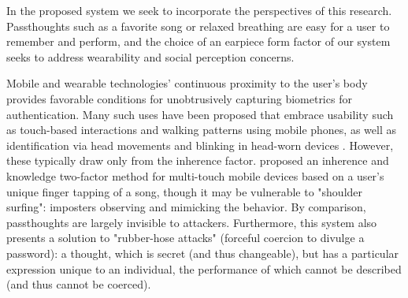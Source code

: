 \documentclass{sigchi}
\begin{document}
In the proposed system we seek to incorporate the perspectives of this research. Passthoughts such as a favorite song or relaxed breathing are easy for a user to remember and perform, and the choice of an earpiece form factor of our system seeks to address wearability and social perception concerns.

Mobile and wearable technologies' continuous proximity to the user's body provides favorable conditions for unobtrusively capturing biometrics for authentication. Many such uses have been proposed that embrace usability such as touch-based interactions \cite{Tartz2015, Holz2015} and walking patterns \cite{Lu2014} using mobile phones, as well as identification via head movements and blinking in head-worn devices \cite{Rogers2015}. However, these typically draw only from the inherence factor. \cite{Chen2015} proposed an inherence and knowledge two-factor method for multi-touch mobile devices based on a user's unique finger tapping of a song, though it may be vulnerable to "shoulder surfing": imposters observing and mimicking the behavior. By comparison, passthoughts are largely invisible to attackers. Furthermore, this system also presents a solution to "rubber-hose attacks" (forceful coercion to divulge a password): a thought, which is secret (and thus changeable), but has a particular expression unique to an individual, the performance of which cannot be described (and thus cannot be coerced).



\end{document}
